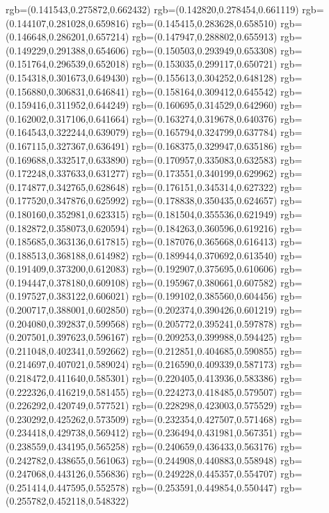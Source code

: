 {{{			rgb=(0.141543,0.275872,0.662432)
			rgb=(0.142820,0.278454,0.661119)
			rgb=(0.144107,0.281028,0.659816)
			rgb=(0.145415,0.283628,0.658510)
			rgb=(0.146648,0.286201,0.657214)
			rgb=(0.147947,0.288802,0.655913)
			rgb=(0.149229,0.291388,0.654606)
			rgb=(0.150503,0.293949,0.653308)
			rgb=(0.151764,0.296539,0.652018)
			rgb=(0.153035,0.299117,0.650721)
			rgb=(0.154318,0.301673,0.649430)
			rgb=(0.155613,0.304252,0.648128)
			rgb=(0.156880,0.306831,0.646841)
			rgb=(0.158164,0.309412,0.645542)
			rgb=(0.159416,0.311952,0.644249)
			rgb=(0.160695,0.314529,0.642960)
			rgb=(0.162002,0.317106,0.641664)
			rgb=(0.163274,0.319678,0.640376)
			rgb=(0.164543,0.322244,0.639079)
			rgb=(0.165794,0.324799,0.637784)
			rgb=(0.167115,0.327367,0.636491)
			rgb=(0.168375,0.329947,0.635186)
			rgb=(0.169688,0.332517,0.633890)
			rgb=(0.170957,0.335083,0.632583)
			rgb=(0.172248,0.337633,0.631277)
			rgb=(0.173551,0.340199,0.629962)
			rgb=(0.174877,0.342765,0.628648)
			rgb=(0.176151,0.345314,0.627322)
			rgb=(0.177520,0.347876,0.625992)
			rgb=(0.178838,0.350435,0.624657)
			rgb=(0.180160,0.352981,0.623315)
			rgb=(0.181504,0.355536,0.621949)
			rgb=(0.182872,0.358073,0.620594)
			rgb=(0.184263,0.360596,0.619216)
			rgb=(0.185685,0.363136,0.617815)
			rgb=(0.187076,0.365668,0.616413)
			rgb=(0.188513,0.368188,0.614982)
			rgb=(0.189944,0.370692,0.613540)
			rgb=(0.191409,0.373200,0.612083)
			rgb=(0.192907,0.375695,0.610606)
			rgb=(0.194447,0.378180,0.609108)
			rgb=(0.195967,0.380661,0.607582)
			rgb=(0.197527,0.383122,0.606021)
			rgb=(0.199102,0.385560,0.604456)
			rgb=(0.200717,0.388001,0.602850)
			rgb=(0.202374,0.390426,0.601219)
			rgb=(0.204080,0.392837,0.599568)
			rgb=(0.205772,0.395241,0.597878)
			rgb=(0.207501,0.397623,0.596167)
			rgb=(0.209253,0.399988,0.594425)
			rgb=(0.211048,0.402341,0.592662)
			rgb=(0.212851,0.404685,0.590855)
			rgb=(0.214697,0.407021,0.589024)
			rgb=(0.216590,0.409339,0.587173)
			rgb=(0.218472,0.411640,0.585301)
			rgb=(0.220405,0.413936,0.583386)
			rgb=(0.222326,0.416219,0.581455)
			rgb=(0.224273,0.418485,0.579507)
			rgb=(0.226292,0.420749,0.577521)
			rgb=(0.228298,0.423003,0.575529)
			rgb=(0.230292,0.425262,0.573509)
			rgb=(0.232354,0.427507,0.571468)
			rgb=(0.234418,0.429738,0.569412)
			rgb=(0.236494,0.431981,0.567351)
			rgb=(0.238559,0.434195,0.565258)
			rgb=(0.240659,0.436433,0.563176)
			rgb=(0.242782,0.438655,0.561063)
			rgb=(0.244908,0.440883,0.558948)
			rgb=(0.247068,0.443126,0.556836)
			rgb=(0.249228,0.445357,0.554707)
			rgb=(0.251414,0.447595,0.552578)
			rgb=(0.253591,0.449854,0.550447)
			rgb=(0.255782,0.452118,0.548322)
}}}
